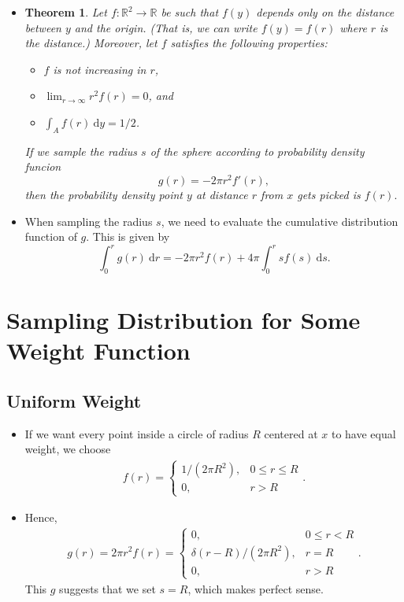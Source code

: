 \documentclass[10pt]{article}
\newtheorem{theorem}[lemma]{Theorem}
\newcommand{\dee}{\mathrm{d}}
\begin{document}
\begin{itemize}
	\item \begin{theorem}
		Let $f: \mathbb{R}^2 \rightarrow \mathbb{R}$ be such that $f(y)$ 
		depends only on the distance between $y$ and the origin. 
		(That is, we can write $f(y) = f(r)$ where $r$ is the distance.)
		Moreover, let $f$ satisfies the following properties:
		\begin{itemize}
			\item $f$ is not increasing in $r$,
			\item $\lim_{r \rightarrow \infty} r^2 f(r) = 0$, and
			\item $\int_A f(r)\ \dee y = 1/2$.
		\end{itemize}
		If we sample the radius $s$ of the sphere according to probability
		density funcion $$g(r) = -2\pi r^2 f'(r),$$
		then the probability density point $y$ at distance $r$ from $x$ gets
		picked is $f(r).$
	\end{theorem}
	
	\item When sampling the radius $s$, we need to evaluate the cumulative
	distribution function of $g$. This is given by
	$$\int_0^r g(r)\ \dee r = - 2\pi r^2 f(r) + 4\pi \int_0^r sf(s)\ \dee s.$$
\end{itemize}

\section{Sampling Distribution for Some Weight Function}

\subsection{Uniform Weight}
\begin{itemize}
	\item If we want every point inside a circle of radius $R$
		centered at $x$ to have equal weight, we choose
		\begin{align*}
			f(r) = \begin{cases}
				1/(2\pi R^2), & 0 \leq r \leq R \\
				0, & r > R
			\end{cases}.
		\end{align*}
	\item Hence,
		\begin{align*}
			g(r) = 2\pi r^2 f(r) = \begin{cases}
				0, & 0 \leq r < R \\
				\delta(r - R)/(2\pi R^2), & r = R \\
				0, & r > R
			\end{cases}.
		\end{align*}
		This $g$ suggests that we set $s = R$, which makes perfect sense.
\end{itemize}
\end{document}
